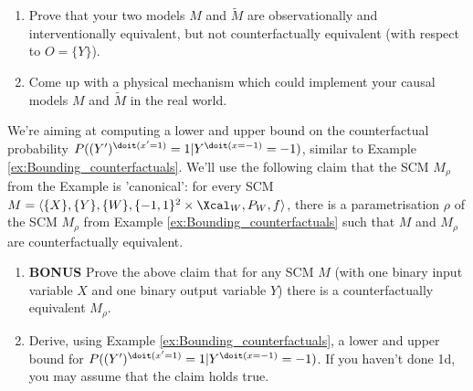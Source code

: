 \begin{enumerate}
\begin{enumerate}
  \emph{Hint: Think of two different causal mechanisms, one which ignores the input orientation, and another one which makes use of it.}

  \item Prove that your two models $M$ and $\tilde{M}$ are observationally and interventionally equivalent, but not counterfactually equivalent (with respect to $O = \{Y\}$).
  \item Come up with a physical mechanism which could implement your causal models $M$ and $\tilde{M}$ in the real world.
\end{enumerate}
We're aiming at computing a lower and upper bound on the counterfactual probability $P((Y')^{\doit(x'=1)}=1|Y^{\doit(x=-1)}=-1)$, similar to Example \ref*{ex:Bounding_counterfactuals}. We'll use the following claim that the SCM $M_\rho$ from the Example is 'canonical': for every SCM $M=\langle \{X\}, \{Y\}, \{W\}, \{-1,1\}^2\times \Xcal_W, P_W, f \rangle$, there is a parametrisation $\rho$ of the SCM $M_\rho$ from Example \ref*{ex:Bounding_counterfactuals} such that $M$ and $M_\rho$ are counterfactually equivalent.
\begin{enumerate}[resume*]
  \item \textbf{BONUS} Prove the above claim that for any SCM $M$ (with one binary input variable $X$ and one binary output variable $Y$) there is a counterfactually equivalent $M_\rho$.
  \item Derive, using Example \ref*{ex:Bounding_counterfactuals}, a lower and upper bound for $P((Y')^{\doit(x'=1)}=1|Y^{\doit(x=-1)}=-1)$. If you haven't done 1d, you may assume that the claim holds true.
  
\end{enumerate}	



\end{enumerate}
